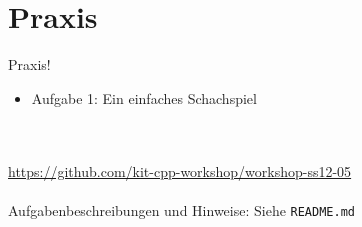 \section{Praxis}
\begin{frame}[fragile]{Praxis!}
	\begin{itemize}
		\item Aufgabe 1: Ein einfaches Schachspiel
	\end{itemize}
	\ \\
	\ \\
	\large{\url{https://github.com/kit-cpp-workshop/workshop-ss12-05}} \\
	\ \\
	Aufgabenbeschreibungen und Hinweise: Siehe \verb|README.md|

\end{frame}
